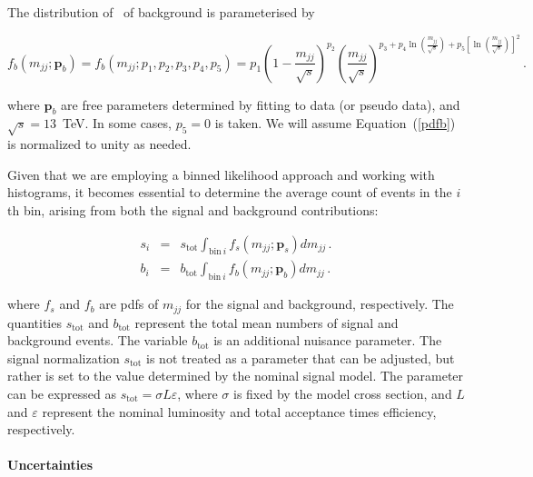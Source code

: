 
The distribution of \mjj~of background is parameterised by

\begin{equation}\label{pdfb}
f_b(m_{jj};\bm{p}_b) = f_b(m_{jj};p_1,p_2,p_3,p_4,p_5) = p_1 \left( 1
- \frac{m_{jj}}{\sqrt{s}} \right)^{p_2} \left( \frac{m_{jj}}{\sqrt{s}}
\right)^{p_3 + p_4\ln\left( \frac{m_{jj}}{\sqrt{s}} \right) +  p_5
  \left[ \ln \left( \frac{m_{jj}}{\sqrt{s}} \right) \right]^2}\, .  
\end{equation}

\noindent
where $\bm{p}_b$ are free parameters determined by fitting to data (or 
pseudo data), and $\sqrt{s} = 13$~TeV.
In some cases, $p_5 = 0$ is taken. 
We will assume Equation~(\ref{pdfb}) is normalized to unity as needed.

Given that we are employing a binned likelihood approach and working with histograms, it becomes essential to determine the average count of events in the $i$th bin, arising from both the signal and background contributions:

\begin{eqnarray}
s_i & = & s_\mathrm{tot} \int_{\mathrm{bin}\ i} f_s(m_{jj};\bm{p}_s)
dm_{jj}\, .\\
b_i & = & b_\mathrm{tot} \int_{\mathrm{bin}\ i} f_b(m_{jj};\bm{p}_b) dm_{jj}\, .
\end{eqnarray}

\noindent
where $f_s$ and $f_b$ are pdfs of $m_{jj}$ for the signal and
background, respectively. 
The quantities $s_\mathrm{tot}$ and $b_\mathrm{tot}$ represent the total mean
numbers of signal and background events.
The variable $b_\mathrm{tot}$ is an additional nuisance parameter.
The signal normalization $s_\mathrm{tot}$ is  not treated as a parameter that can be adjusted, but rather is set to the value determined by the nominal signal model. 
The parameter can be expressed as $s_\mathrm{tot} = \sigma L \varepsilon$,
where $\sigma$ is fixed by the model cross section, and $L$ and
$\varepsilon$ represent the nominal luminosity and total acceptance times
efficiency, respectively.


\paragraph{Uncertainties}\mbox{}\par
\label{sec:unc}

